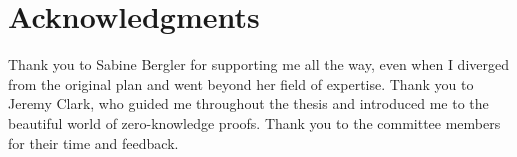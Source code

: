 
\chapter*{Acknowledgments}


Thank you to Sabine Bergler for supporting me all the way, even when I diverged from the original plan and went beyond her field of expertise.
Thank you to Jeremy Clark, who guided me throughout the thesis and introduced me to the beautiful world of zero-knowledge proofs.
Thank you to the committee members for their time and feedback.